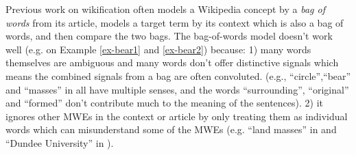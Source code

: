 

Previous work on wikification often models a Wikipedia concept by a {\em bag of
words} from its article, models a target term by its context
which is also a bag of words, and then compare the two bags.
The bag-of-words model doesn't work well
(e.g. on Example \ref{ex-bear1} and \ref{ex-bear2}) because:
1) many words themselves are ambiguous and many words don't offer distinctive
signals which means the combined signals from a bag are often convoluted.
(e.g., ``circle'',``bear'' and ``masses'' in 
all have multiple senses, and the words ``surrounding'',
``original'' and ``formed'' don't contribute much to the meaning of the
sentences).
2) it ignores other MWEs in the context or article by only treating them
as individual words which can misunderstand
some of the MWEs (e.g. ``land masses'' in 
and ``Dundee University'' in ).


